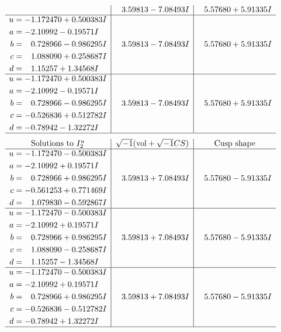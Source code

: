 \documentclass[1p]{elsarticle_modified}
\theoremstyle{definition}
\newcommand{\I}{\sqrt{-1}}
\begin{document}
$$\begin{array}{c|c|c}
 & \phantom{-}3.59813 - 7.08493 I & \phantom{-}5.57680 + 5.91335 I \\ \hline\begin{aligned}
u &= -1.172470 + 0.500383 I \\
a &= -2.10992 - 0.19571 I \\
b &= \phantom{-}0.728966 - 0.986295 I \\
c &= \phantom{-}1.088090 + 0.258687 I \\
d &= \phantom{-}1.15257 + 1.34568 I\end{aligned}
 & \phantom{-}3.59813 - 7.08493 I & \phantom{-}5.57680 + 5.91335 I \\ \hline\begin{aligned}
u &= -1.172470 + 0.500383 I \\
a &= -2.10992 - 0.19571 I \\
b &= \phantom{-}0.728966 - 0.986295 I \\
c &= -0.526836 + 0.512782 I \\
d &= -0.78942 - 1.32272 I\end{aligned}
 & \phantom{-}3.59813 - 7.08493 I & \phantom{-}5.57680 + 5.91335 I\\
 \hline 
 \end{array}$$\newpage$$\begin{array}{c|c|c}  
\text{Solutions to }I^u_{2}& \I (\text{vol} + \sqrt{-1}CS) & \text{Cusp shape}\\
 \hline 
\begin{aligned}
u &= -1.172470 - 0.500383 I \\
a &= -2.10992 + 0.19571 I \\
b &= \phantom{-}0.728966 + 0.986295 I \\
c &= -0.561253 + 0.771469 I \\
d &= \phantom{-}1.079830 - 0.592867 I\end{aligned}
 & \phantom{-}3.59813 + 7.08493 I & \phantom{-}5.57680 - 5.91335 I \\ \hline\begin{aligned}
u &= -1.172470 - 0.500383 I \\
a &= -2.10992 + 0.19571 I \\
b &= \phantom{-}0.728966 + 0.986295 I \\
c &= \phantom{-}1.088090 - 0.258687 I \\
d &= \phantom{-}1.15257 - 1.34568 I\end{aligned}
 & \phantom{-}3.59813 + 7.08493 I & \phantom{-}5.57680 - 5.91335 I \\ \hline\begin{aligned}
u &= -1.172470 - 0.500383 I \\
a &= -2.10992 + 0.19571 I \\
b &= \phantom{-}0.728966 + 0.986295 I \\
c &= -0.526836 - 0.512782 I \\
d &= -0.78942 + 1.32272 I\end{aligned}
 & \phantom{-}3.59813 + 7.08493 I & \phantom{-}5.57680 - 5.91335 I\\
 \hline 
 \end{array}$$\newpage\newpage\renewcommand{\arraystretch}{1}
\end{document}
